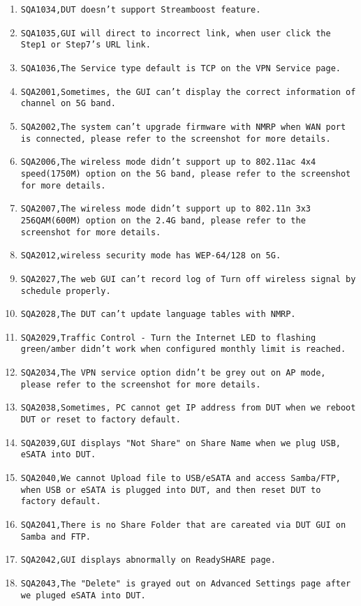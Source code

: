 \documentclass[12pt]{report}
\begin{document}
\begin{itemize}
\begin{enumerate}
		\item \texttt{SQA1034,DUT doesn't support Streamboost feature.}
		\item \texttt{SQA1035,GUI will direct to incorrect link, when user click the Step1 or Step7's URL link.}
		\item \texttt{SQA1036,The Service type default is TCP on the VPN Service page.}
		\item \texttt{SQA2001,Sometimes, the GUI can't display the correct information of channel on 5G band.}
		\item \texttt{SQA2002,The system can't upgrade firmware with NMRP when WAN port is connected, please refer to the screenshot for more details.}
		\item \texttt{SQA2006,The wireless mode didn't support up to 802.11ac 4x4 speed(1750M) option on the 5G band, please refer to the screenshot for more details.}
		\item \texttt{SQA2007,The wireless mode didn't support up to 802.11n 3x3 256QAM(600M) option on the 2.4G band, please refer to the screenshot for more details.}
		\item \texttt{SQA2012,wireless security mode has WEP-64/128 on 5G.}
		\item \texttt{SQA2027,The web GUI can't record log of Turn off wireless signal by schedule properly.}
		\item \texttt{SQA2028,The DUT can't update language tables with NMRP.}
		\item \texttt{SQA2029,Traffic Control - Turn the Internet LED to flashing green/amber didn't work when configured monthly limit is reached.}
		\item \texttt{SQA2034,The VPN service option didn't be grey out on AP mode, please refer to the screenshot for more details.}
		\item \texttt{SQA2038,Sometimes, PC cannot get IP address from DUT when we reboot DUT or reset to factory default.}
		\item \texttt{SQA2039,GUI displays "Not Share" on Share Name when we plug USB, eSATA into DUT.}
		\item \texttt{SQA2040,We cannot Upload file to USB/eSATA and access Samba/FTP, when USB or eSATA is plugged into DUT, and then reset DUT to factory default.}
		\item \texttt{SQA2041,There is no Share Folder that are careated via DUT GUI on Samba and FTP.}
		\item \texttt{SQA2042,GUI displays abnormally on ReadySHARE page.}
		\item \texttt{SQA2043,The "Delete" is grayed out on Advanced Settings page after we pluged eSATA into DUT.}

\end{enumerate}
\end{itemize}
\end{document}
